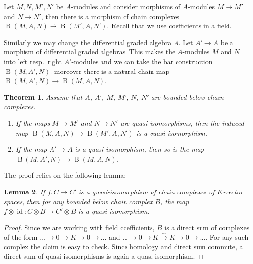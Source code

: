 \documentclass{scrartcl}
\theoremstyle{plain}
\newtheorem{theorem}{Theorem}[section]
\newtheorem{lemma}[theorem]{Lemma}
\theoremstyle{definition}
\let\xto\xrightarrow
\DeclareMathOperator{\id}{id}
\DeclareMathOperator{\BC}{B}
\begin{document}
Let $M, N, M', N'$ be $A$-modules and consider morphisms of $A$-modules $M\to M'$ and $N\to N'$, then there is a morphism of chain complexes $\BC(M, A, N)\to \BC(M', A, N')$. Recall that we use coefficients in a field.

Similarly we may change the differential graded algebra $A$. Let $A'\to A$ be a morphism of differential graded algebras. This makes the $A$-modules $M$ and $N$ into left resp.\ right $A'$-modules and we can take the bar construction $\BC(M, A', N)$, moreover there is a natural chain map $\BC(M, A', N)\to \BC(M, A, N)$.

\begin{theorem} \label{thm:bar-quiso} Assume that $A$, $A'$, $M$, $M'$, $N$, $N'$ are bounded below chain complexes.
    \begin{enumerate}
    \item If the maps $M\to M'$ and $N\to N'$ are quasi-isomorphisms, then the induced map $\BC(M, A, N)\to \BC(M', A, N')$ is a quasi-isomorphism.
    \item If the map $A'\to A$ is a quasi-isomorphism, then so is the map $\BC(M, A', N)\to \BC(M, A, N)$. 
    \end{enumerate}
\end{theorem}
The proof relies on the following lemma:
\begin{lemma} If $f\colon C\to C'$ is a quasi-isomorphism of chain complexes of $K$-vector spaces, then for any bounded below chain complex $B$, the map $f\otimes \id\colon C\otimes B\to C'\otimes B$ is a quasi-isomorphism. 
\end{lemma}
\begin{proof}
    Since we are working with field coefficients, $B$ is a direct sum of complexes of the form $\dots\to0\to K\to 0\to\dots$ and $\dots\to 0\to K\xto{\sim} K\to 0\to\dots$. For any such complex the claim is easy to check. Since homology and direct sum commute, a direct sum of quasi-isomorphisms is again a quasi-isomorphism.
\end{proof}
\end{document}
